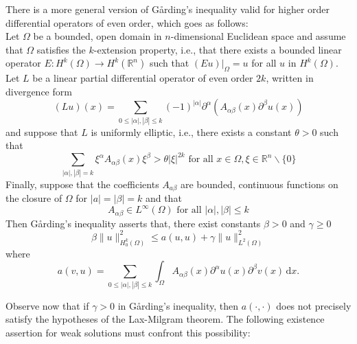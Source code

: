 \documentclass[11pt]{article}
\begin{document}
			\begin{remark}
			    There is a more general version of G\aa rding's inequality valid for higher order differential operators of even order, which goes as follows:\\ Let \(\Omega\) be a bounded, open domain in \(n\)-dimensional Euclidean space and assume that \(\Omega\) satisfies the \(k\)-extension property, i.e., that there exists a bounded linear
                operator \(E: H^{k}(\Omega) \rightarrow H^{k}\left(\mathbb{R}^{n}\right)\) such that \(\left.(E u)\right|_{\Omega}=u\) for all \(u\) in \(H^{k}(\Omega)\).
                Let \(L\) be a linear partial differential operator of even order \(2 k\), written in divergence form
                $$
                (L u)(x)=\sum_{0 \leq|\alpha|,|\beta| \leq k}(-1)^{|\alpha|} \partial^{\alpha}\left(A_{\alpha \beta}(x) \partial^{\beta} u(x)\right)
                $$
                and suppose that \(L\) is uniformly elliptic, i.e., there exists a constant \(\theta>0\) such that
                $$
                \sum_{|\alpha|,|\beta|=k} \xi^{\alpha} A_{\alpha \beta}(x) \xi^{\beta}>\theta|\xi|^{2 k} \text { for all } x \in \Omega, \xi \in \mathbb{R}^{n} \backslash\{0\}
                $$
                Finally, suppose that the coefficients \(A_{a \beta}\) are bounded, continuous functions on the closure of \(\Omega\) for \(|a|=|\beta|=k\) and that
                $$
                A_{\alpha \beta} \in L^{\infty}(\Omega) \text { for all }|\alpha|,|\beta| \leq k
                $$
                Then Gårding's inequality asserts that, there exist constants \(\beta>0\) and \(\gamma \geq 0\)
                $$
                \beta\|u\|_{H^{k}_{0}(\Omega)}^{2}\leq a(u, u)+\gamma\|u\|_{L^{2}(\Omega)}^{2} 
                $$
                where
                $$
                a(v, u)=\sum_{0 \leq|\alpha|,|\beta| \leq k} \int_{\Omega} A_{\alpha \beta}(x) \partial^{\alpha} u(x) \partial^{\beta} v(x)\, \mathrm{d} x.
                $$
                \end{remark}

			Observe now that if $\gamma>0$ in G\aa rding's inequality, then $a(\cdot,\cdot)$ does not precisely satisfy the hypotheses of the Lax-Milgram theorem. The following existence assertion for weak solutions must confront this possibility:
\end{document}
